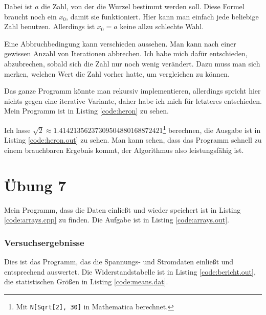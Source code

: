 Dabei ist $a$ die Zahl, von der die Wurzel bestimmt werden soll. Diese Formel braucht noch ein $x_0$, damit sie funktioniert. Hier kann man einfach jede beliebige Zahl benutzen. Allerdings ist $x_0=a$ keine allzu schlechte Wahl.

Eine Abbruchbedingung kann verschieden aussehen. Man kann nach einer gewissen Anzahl von Iterationen abbrechen. Ich habe mich dafür entschieden, abzubrechen, sobald sich die Zahl nur noch wenig verändert. Dazu muss man sich merken, welchen Wert die Zahl vorher hatte, um vergleichen zu können.

Das ganze Programm könnte man rekursiv implementieren, allerdings spricht hier nichts gegen eine iterative Variante, daher habe ich mich für letzteres entschieden. Mein Programm ist in Listing \ref{code:heron} zu sehen.



Ich lasse $\sqrt{2} \approx 1.41421356237309504880168872421$\footnote{Mit \texttt{N[Sqrt[2], 30]} in Mathematica berechnet.} berechnen, die Ausgabe ist in Listing \ref{code:heron.out} zu sehen. Man kann sehen, dass das Programm schnell zu einem brauchbaren Ergebnis kommt, der Algorithmus also leistungsfähig ist.



\chapter{Übung 7}

Mein Programm, dass die Daten einließt und wieder speichert ist in Listing \ref{code:arrays.cpp} zu finden. Die Aufgabe ist in Listing \ref{code:arrays.out}.




\subsection{Versuchsergebnisse}

Dies ist das Programm, das die Spannungs- und Stromdaten einließt und entsprechend auswertet. Die Widerstandstabelle ist in Listing \ref{code:bericht.out}, die statistischen Größen in Listing \ref{code:means.dat}.

